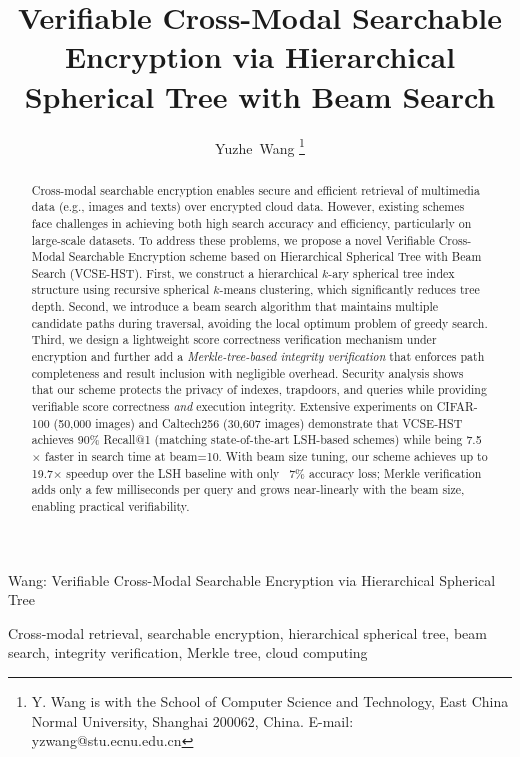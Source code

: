 \documentclass[journal]{IEEEtran}
\begin{document}
\title{Verifiable Cross-Modal Searchable Encryption via Hierarchical Spherical Tree with Beam Search}

\author{Yuzhe~Wang
\thanks{Y. Wang is with the School of Computer Science and Technology, East China Normal University, Shanghai 200062, China. E-mail: yzwang@stu.ecnu.edu.cn}
}

%
{Wang: Verifiable Cross-Modal Searchable Encryption via Hierarchical Spherical Tree}

\maketitle
\begin{abstract}
Cross-modal searchable encryption enables secure and efficient retrieval of multimedia data (e.g., images and texts) over encrypted cloud data. However, existing schemes face challenges in achieving both high search accuracy and efficiency, particularly on large-scale datasets. To address these problems, we propose a novel Verifiable Cross-Modal Searchable Encryption scheme based on Hierarchical Spherical Tree with Beam Search (VCSE-HST). First, we construct a hierarchical $k$-ary spherical tree index structure using recursive spherical $k$-means clustering, which significantly reduces tree depth. Second, we introduce a beam search algorithm that maintains multiple candidate paths during traversal, avoiding the local optimum problem of greedy search. Third, we design a lightweight score correctness verification mechanism under encryption and further add a \emph{Merkle-tree-based integrity verification} that enforces path completeness and result inclusion with negligible overhead. Security analysis shows that our scheme protects the privacy of indexes, trapdoors, and queries while providing verifiable score correctness \emph{and} execution integrity. Extensive experiments on CIFAR-100 (50{,}000 images) and Caltech256 (30{,}607 images) demonstrate that VCSE-HST achieves 90\% Recall@1 (matching state-of-the-art LSH-based schemes) while being 7.5$\times$ faster in search time at beam=10. With beam size tuning, our scheme achieves up to 19.7$\times$ speedup over the LSH baseline with only ~7\% accuracy loss; Merkle verification adds only a few milliseconds per query and grows near-linearly with the beam size, enabling practical verifiability.
\end{abstract}

\begin{IEEEkeywords}
Cross-modal retrieval, searchable encryption, hierarchical spherical tree, beam search, integrity verification, Merkle tree, cloud computing
\end{IEEEkeywords}
\end{document}

